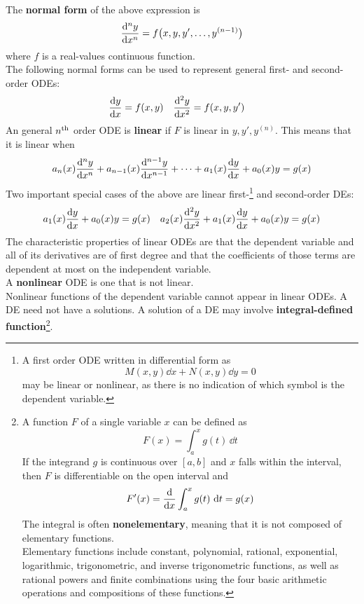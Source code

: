 \documentclass[../Differential Equations.tex]{subfiles}
\begin{document}
			The \textbf{normal form} of the above expression is
				\[\dv[n]{y}{x} = f\bigl(x, y, y', \ldots, y^{(n - 1)}\bigr)\]
				where \(f\) is a real-values continuous function. \\
			The following normal forms can be used to represent general first- and second-order ODEs:
				\begin{align*}
					\dv{y}{x} &= f(x, y)
							& \dv[2]{y}{x} &= f(x, y, y') 
				\end{align*}
			An general \(n^{\text{th}}\) order ODE is \textbf{linear} if \(F\) is linear in \(y, y', y^{(n)}\). This means that it is linear when
				\[a_n(x)\dv[n]{y}{x} + a_{n - 1}(x)\dv[n - 1]{y}{x} + \cdots + a_1(x)\dv{y}{x} + a_0(x)y = g(x)\]
			Two important special cases of the above are linear first-\footnote{
					A first order ODE written in differential form as
						\[M(x, y)\dd{x} + N(x, y)\dd{y} = 0\]
						may be linear or nonlinear, as there is no indication of which symbol is the dependent variable.
				} and second-order DEs:
				\begin{align*}
					a_1(x)\dv{y}{x} + a_0(x)y &= g(x)
							& a_2(x)\dv[2]{y}{x} + a_1(x)\dv{y}{x} + a_0(x)y = g(x)
				\end{align*}
			The characteristic properties of linear ODEs are that the dependent variable and all of its derivatives are of first degree and that the coefficients of those terms are dependent at most on the independent variable. \\
			A \textbf{nonlinear} ODE is one that is not linear. \\
			Nonlinear functions of the dependent variable cannot appear in linear ODEs.
			A DE need not have a solutions.
			A solution of a DE may involve \textbf{integral-defined function}\footnote{
					A function \(F\) of a single variable \(x\) can be defined as
						\[F(x) = \int_a^x g(t)\,\dd{t}\]
						If the integrand \(g\) is continuous over \([a, b]\) and \(x\) falls within the interval, then \(F\) is differentiable on the open interval and
						\[F'(x) = \dv{x}\int_a^x g(t)\,\dd{t} = g(x)\]
						The integral is often \textbf{nonelementary}, meaning that it is not composed of elementary functions. \\
						Elementary functions include constant, polynomial, rational, exponential, logarithmic, trigonometric, and inverse trigonometric functions, as well as rational powers and finite combinations using the four basic arithmetic operations and compositions of these functions.
				}. \\
\end{document}
